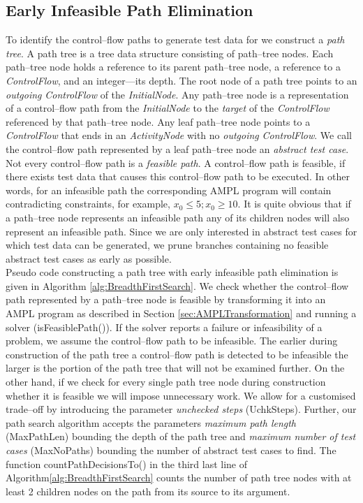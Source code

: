 \documentclass[runningheads,a4paper]{llncs}%
\newcommand{\UMLType}[1]{\textsf{\textit{#1}}} %
\newcommand{\UMLReference}[1]{\textsf{\textit{#1}}} %
\begin{document}
\subsection{Early Infeasible Path Elimination}%
\label{sec:InfeasiblePathElimination}%
To identify the control--flow paths to generate test data for we construct a \emph{path tree}. A path tree is a tree data structure consisting of path--tree nodes. Each path--tree node holds a reference to its parent path--tree node, a reference to a \UMLType{ControlFlow}, and an integer---its depth. The root node of a path tree points to an \UMLReference{outgoing} \UMLType{ControlFlow} of the \UMLType{InitialNode}. Any path--tree node is a representation of a control--flow path from the \UMLType{InitialNode} to the \UMLReference{target} of the \UMLType{ControlFlow} referenced by that path--tree node. Any leaf path--tree node points to a \UMLType{ControlFlow} that ends in an \UMLType{ActivityNode} with no \UMLReference{outgoing} \UMLType{ControlFlow}. We call the control--flow path represented by a leaf path--tree node an \emph{abstract test case}.\\
Not every control--flow path is a \emph{feasible path}. A control--flow path is feasible, if there exists test data that causes this control--flow path to be executed. In other words, for an infeasible path the corresponding AMPL program will contain contradicting constraints, for example, $x_0\leq5; x_0\geq10$. It is quite obvious that if a path--tree node represents an infeasible path any of its children nodes will also represent an infeasible path. Since we are only interested in abstract test cases for which test data can be generated, we prune branches containing no feasible abstract test cases as early as possible.\\
Pseudo code constructing a path tree with early infeasible path elimination is given in Algorithm \ref{alg:BreadthFirstSearch}. We check whether the control--flow path represented by a path--tree node is feasible by transforming it into an AMPL program as described in Section \ref{sec:AMPLTransformation} and running a solver (isFeasiblePath()). If the solver reports a failure or infeasibility of a problem, we assume the control--flow path to be infeasible. The earlier during construction of the path tree a control--flow path is detected to be infeasible the larger is the portion of the path tree that will not be examined further. On the other hand, if we check for every single path tree node during construction whether it is feasible we will impose unnecessary work. We allow for a customised trade--off by introducing the parameter \emph{unchecked steps} (UchkSteps). Further, our path search algorithm accepts the parameters \emph{maximum path length} (MaxPathLen) bounding the depth of the path tree and \emph{maximum number of test cases} (MaxNoPaths) bounding the number of abstract test cases to find. The function countPathDecisionsTo() in the third last line of Algorithm\ref{alg:BreadthFirstSearch} counts the number of path tree nodes with at least 2 children nodes on the path from its source to its argument. %
\end{document}
